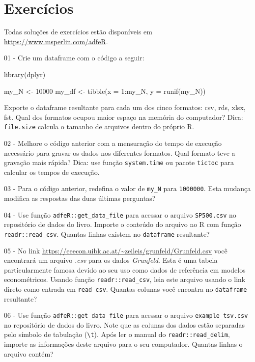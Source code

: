 \documentclass[
  11pt,
]{book}
\newenvironment{Shaded}{\begin{snugshade}}{\end{snugshade}}
\newcommand{\NormalTok}[1]{#1}
\begin{document}
\hypertarget{exerc-importacao-exportacao}{%
\section{Exercícios}\label{exerc-importacao-exportacao}}

Todas soluções de exercícios estão disponíveis em \url{https://www.msperlin.com/adfeR}.

01 -
Crie um dataframe com o código a seguir:

\begin{Shaded}
\begin{Highlighting}[]
\NormalTok{library(dplyr)}

\NormalTok{my\_N \textless{}{-} 10000}
\NormalTok{my\_df \textless{}{-} tibble(x = 1:my\_N,}
\NormalTok{                y = runif(my\_N))}
\end{Highlighting}
\end{Shaded}

Exporte o dataframe resultante para cada um dos cinco formatos: csv, rds, xlsx, fst. Qual dos formatos ocupou maior espaço na memória do computador? Dica: \texttt{file.size} calcula o tamanho de arquivos dentro do próprio R.

02 -
Melhore o código anterior com a mensuração do tempo de execução necessário para gravar os dados nos diferentes formatos. Qual formato teve a gravação mais rápida? Dica: use função \texttt{system.time} ou pacote \texttt{tictoc} para calcular os tempos de execução.

03 -
Para o código anterior, redefina o valor de \texttt{my\_N} para \texttt{1000000}. Esta mudança modifica as respostas das duas últimas perguntas?

04 -
Use função \texttt{adfeR::get\_data\_file} para acessar o arquivo \texttt{SP500.csv} no repositório de dados do livro. Importe o conteúdo do arquivo no R com função \texttt{readr::read\_csv}. Quantas linhas existem no \texttt{dataframe} resultante?

05 -
No link \url{https://eeecon.uibk.ac.at/~zeileis/grunfeld/Grunfeld.csv} você encontrará um arquivo \emph{.csv} para os dados \emph{Grunfeld}. Esta é uma tabela particularmente famosa devido ao seu uso como dados de referência em modelos econométricos. Usando função \texttt{readr::read\_csv}, leia este arquivo usando o link direto como entrada em \texttt{read\_csv}. Quantas colunas você encontra no \texttt{dataframe} resultante?

06 -
Use função \texttt{adfeR::get\_data\_file} para acessar o arquivo \texttt{example\_tsv.csv} no repositório de dados do livro. Note que as colunas dos dados estão separadas pelo símbolo de tabulação (\texttt{\textquotesingle{}\textbackslash{}t\textquotesingle{}}). Após ler o manual do \texttt{readr::read\_delim}, importe as informações deste arquivo para o seu computador. Quantas linhas o arquivo contém?
\end{document}
